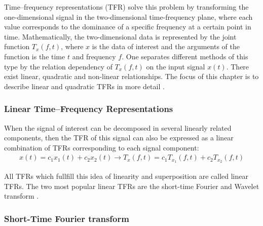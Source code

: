 Time–frequency representations (TFR) solve this problem by transforming the one-dimensional signal in the two-dimensional time-frequency plane, where each value corresponds to the dominance of a specific frequency at a certain point in time. Mathematically, the two-dimensional data is represented by the joint function $T_{x}(f,t)$, where $x$ is the data of interest and the arguments of the function is the time  $t$ and frequency  $f$. One separates different methods of this type by the relation dependency of $T_{x}(f,t)$ on the input signal $x(t)$. There exist linear, quadratic and non-linear relationships. The focus of this chapter is to describe linear and quadratic TFRs in more detail \cite{Hlawatsch1992}. 

\subsubsection{Linear Time–Frequency Representations}
When the signal of interest can be decomposed in several linearly related components, then the TFR of this signal can also be expressed as a linear combination of TFRs corresponding to each signal component:
\begin{equation}
    \begin{aligned}
        x(t) = c_{1} x_{1}(t) + c_{2} x_{2}(t) \rightarrow T_{x}(f,t) = c_{1} T_{x_{1}}(f,t) + c_{2} T_{x_{2}}(f,t)
    \end{aligned}
\end{equation}


All TFRs which fullfill this idea of linearity and superposition are called linear TFRs. The two most popular linear TFRs are the short-time Fourier and Wavelet transform \cite{Hlawatsch1992}. 
\subsubsection{Short-Time Fourier transform}

